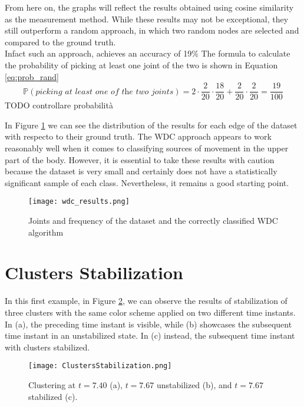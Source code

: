 From here on, the graphs will reflect the results obtained using cosine similarity as the measurement method.
While these results may not be exceptional, they still outperform a random approach, in which two random nodes are selected and compared to the ground truth. \\
Infact such an approach, achieves an accuracy of 19\% 
The formula to calculate the probability of picking at least one joint of the two is shown in Equation \ref{eq:prob_rand}
\begin{equation}
  \mathbb{P}(\textit{picking at least one of the two joints}) = 2 \cdot \frac{2}{20} \cdot \frac{18}{20} + \frac{2}{20} \cdot \frac{2}{20} = \frac{19}{100}
  \label{eq:prob_rand}
\end{equation}
TODO controllare probabilità

In Figure \ref{fig:wdc_results} we can see the distribution of the results for each edge of the dataset with respecto to their ground truth.
The WDC approach appears to work reasonably well when it comes to classifying sources of movement in the upper part of the body. 
However, it is essential to take these results with caution because the dataset is very small and certainly does not have a statistically significant sample of each class. 
Nevertheless, it remains a good starting point. \\


\begin{figure}[H]
  \centering
  \texttt{[image: wdc\_results.png]}
  \caption{Joints and frequency of the dataset and the correctly classified WDC algorithm}
  \label{fig:wdc_results}
\end{figure}





\clearpage

\section{Clusters Stabilization}
In this first example, in Figure \ref{fig:stabilization_results}, we can observe the results of stabilization of three clusters with the same color scheme applied on two different time instants. 
In (a), the preceding time instant is visible, while (b) showcases the subsequent time instant in an unstabilized state. 
In (c) instead, the subsequent time instant with clusters stabilized.
\begin{figure}[H]
  \centering
  \texttt{[image: ClustersStabilization.png]}
  \caption{Clustering at $t=7.40$ (a), $t=7.67$ unstabilized (b), and $t=7.67$ stabilized (c).}
  \label{fig:stabilization_results}
\end{figure}

